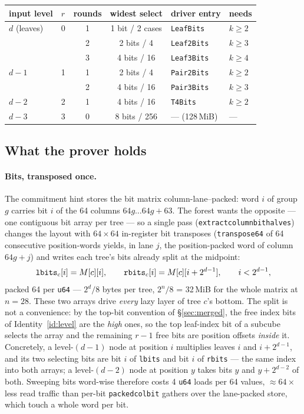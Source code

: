 \documentclass[11pt]{article}
\newcommand{\code}[1]{{\def\_{\textunderscore\allowbreak}\texttt{#1}}}
\theoremstyle{definition}
\begin{document}
\begin{center}
\small
\begin{tabular}{llccll}
\toprule
input level & $r$ & rounds & widest select & driver entry & needs \\
\midrule
$d$ (leaves) & 0 & 1 & 1 bit / 2 cases & \code{LeafBits}  & $k \ge 2$ \\
             &   & 2 & 2 bits / 4      & \code{Leaf2Bits} & $k \ge 3$ \\
             &   & 3 & 4 bits / 16     & \code{Leaf3Bits} & $k \ge 4$ \\
$d-1$        & 1 & 1 & 2 bits / 4      & \code{Pair2Bits} & $k \ge 2$ \\
             &   & 2 & 4 bits / 16     & \code{Pair3Bits} & $k \ge 3$ \\
$d-2$        & 2 & 1 & 4 bits / 16     & \code{T4Bits}    & $k \ge 2$ \\
$d-3$        & 3 & 0 & 8 bits / 256    & --- (128\,MiB)   & --- \\
\bottomrule
\end{tabular}
\end{center}

\subsection{What the prover holds}
\label{sec:tables}

\paragraph{Bits, transposed once.}
The commitment hint stores the bit matrix column-lane--packed: word $i$
of group $g$ carries bit $i$ of the 64 columns $64g \dots 64g{+}63$.
The forest wants the opposite --- one contiguous bit array per tree ---
so a single pass (\code{extract\_column\_bit\_halves}) changes the
layout with $64{\times}64$ in-register bit transposes
(\code{transpose64} of 64 consecutive position-words yields, in lane
$j$, the position-packed word of column $64g{+}j$) and writes each tree's
bits already split at the midpoint:
\[
  \code{lbits}_c[i] = M[c][i], \qquad
  \code{rbits}_c[i] = M[c][i + 2^{d-1}], \qquad i < 2^{d-1},
\]
packed 64 per \code{u64} --- $2^d/8$ bytes per tree, $2^n/8$ = 32\,MiB
for the whole matrix at $n = 28$.  These two arrays drive \emph{every}
lazy layer of tree $c$'s bottom.  The split is not a convenience: by the
top-bit convention of \S\ref{sec:merged}, the free index bits of
Identity~\ref{id:level} are the \emph{high} ones, so the top leaf-index
bit of a subcube selects the array and the remaining $r-1$ free bits are
position offsets \emph{inside} it.  Concretely, a level-$(d{-}1)$ node at
position $i$ multiplies leaves $i$ and $i + 2^{d-1}$, and its two
selecting bits are bit $i$ of \code{lbits} and bit $i$ of \code{rbits}
--- the same index into both arrays; a level-$(d{-}2)$ node at position
$y$ takes bits $y$ and $y + 2^{d-2}$ of both.  Sweeping bits word-wise
therefore costs 4 \code{u64} loads per 64 values, ${\approx}64\times$
less read traffic than per-bit \code{packed\_col\_bit} gathers over the
lane-packed store, which touch a whole word per bit.
\end{document}
